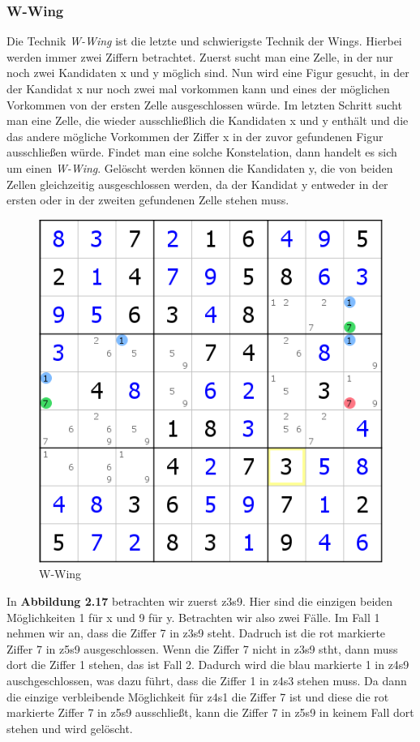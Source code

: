 \newpage
\subsubsection{W-Wing}
Die Technik \textit{W-Wing} ist die letzte und schwierigste Technik der Wings. Hierbei werden immer zwei Ziffern betrachtet. Zuerst sucht man eine Zelle, in der nur noch zwei Kandidaten x und y möglich sind. Nun wird eine Figur gesucht, in der der Kandidat x nur noch zwei mal vorkommen kann und eines der möglichen Vorkommen von der ersten Zelle ausgeschlossen würde. Im letzten Schritt sucht man eine Zelle, die wieder ausschließlich die Kandidaten x und y enthält und die das andere mögliche Vorkommen der Ziffer x in der zuvor gefundenen Figur ausschließen würde. Findet man eine solche Konstelation, dann handelt es sich um einen \textit{W-Wing}. Gelöscht werden können die  Kandidaten y, die von beiden Zellen gleichzeitig ausgeschlossen werden, da der Kandidat y entweder in der ersten oder in der zweiten gefundenen Zelle stehen muss.

\begin{figure}[h]
\begin{center}
\includegraphics{./img/W_Wing.png}
\caption{W-Wing}
\end{center}
\end{figure}

\noindent In \textbf{Abbildung 2.17} betrachten wir zuerst z3s9. Hier sind die einzigen beiden Möglichkeiten 1 für x und 9 für y. Betrachten wir also zwei Fälle. Im Fall 1 nehmen wir an, dass die Ziffer 7 in z3s9 steht. Dadruch ist die rot markierte Ziffer 7 in z5s9 ausgeschlossen. Wenn die Ziffer 7 nicht in z3s9 stht, dann muss dort die Ziffer 1 stehen, das ist Fall 2. Dadurch wird die blau markierte 1 in z4s9 auschgeschlossen, was dazu führt, dass die Ziffer 1 in z4s3 stehen muss. Da dann die einzige verbleibende Möglichkeit für z4s1 die Ziffer 7 ist und diese die rot markierte Ziffer 7 in z5s9 ausschließt, kann die Ziffer 7 in z5s9 in keinem Fall dort stehen und wird gelöscht.